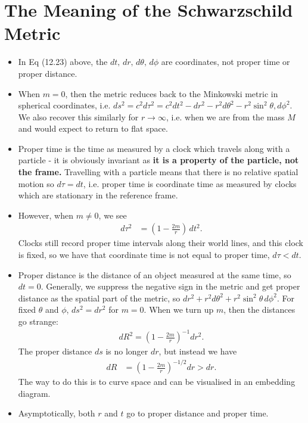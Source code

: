 \documentclass[a4paper, 11pt, normalem]{report}
\begin{document}
\section{The Meaning of the Schwarzschild Metric}
\begin{itemize}
    \item In Eq (12.23) above, the $dt,\,dr,\,d\theta,\,d\phi$ are coordinates, not proper time or proper distance.
    \item When $m=0$, then the metric reduces back to the Minkowski metric in spherical coordinates, i.e. $ds^2=c^2d\tau^2=c^2dt^2-dr^2-r^2d\theta^2-r^2\sin^2\theta,d\phi^2$.
        We also recover this similarly for $r\to\infty$, i.e. when we are from the mass $M$ and would expect to return to flat space.
    \item Proper time is the time as measured by a clock which travels along with a particle - it is obviously invariant as \textbf{it is a property of the particle, not the frame.}
        Travelling with a particle means that there is no relative spatial motion so $d\tau =dt$, i.e. proper time is coordinate time as measured by clocks which are stationary in the reference frame.
    \item However, when $m\neq0$, we see
        \begin{align}
            d\tau^2 &= \left(1-\frac{2m}{r}\right)\,dt^2.
        \end{align}
        Clocks still record proper time intervals along their world lines, and this clock is fixed, so we have that coordinate time is not equal to proper time, $d\tau<dt$.
    \item Proper distance is the distance of an object measured at the same time, so $dt=0$.
        Generally, we suppress the negative sign in the metric and get proper distance as the spatial part of the metric, so $dr^2+r^2d\theta^2+r^2\sin^2\theta\,d\phi^2$.
        For fixed $\theta$ and $\phi$, $ds^2=dr^2$ for $m=0$.
        When we turn up $m$, then the distances go strange:
        \begin{align}
            dR^2 = \left(1-\frac{2m}{r}\right)^{-1}dr^2.
        \end{align}
        The proper distance $ds$ is no longer $dr$, but instead we have
        \begin{align}
            dR &= \left(1-\frac{2m}{r}\right)^{-1/2}dr > dr.
        \end{align}
        The way to do this is to curve space and can be visualised in an embedding diagram.
    \item Asymptotically, both $r$ and $t$ go to proper distance and proper time. 
\end{itemize}
\end{document}
